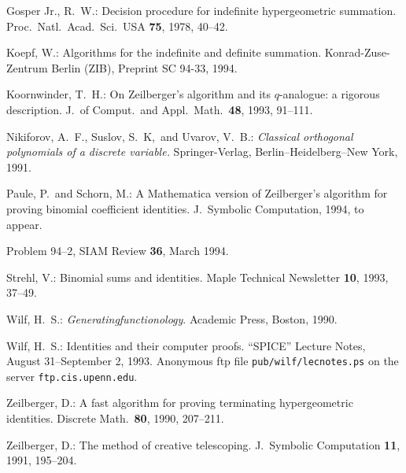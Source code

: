 \begin{thebibliography}{99}

Gosper Jr., R.\ W.:
Decision procedure for indefinite hypergeometric
summation. Proc.\ Natl.\ Acad.\ Sci.\ USA {\bf 75}, 1978, 40--42.

Koepf, W.:
Algorithms for the indefinite and definite summation.
Konrad-Zuse-Zentrum Berlin (ZIB), Preprint SC 94-33, 1994.

Koornwinder, T.\ H.:
On Zeilberger's algorithm and its $q$-analogue: a rigorous description.
J.\ of Comput.\ and Appl.\ Math.\ {\bf 48}, 1993, 91--111.

Nikiforov, A.\ F., Suslov, S.\ K,\ and Uvarov, V.\ B.: {\sl Classical
orthogonal polynomials of a discrete variable.} Springer-Verlag,
Berlin--Heidelberg--New York, 1991.

Paule, P.\ and Schorn, M.: A {\sc Mathematica} version of Zeilberger's
algorithm for proving binomial coefficient identities. J.\ Symbolic
Computation, 1994, to appear.

Problem 94--2, SIAM Review {\bf 36}, March 1994.

Strehl, V.:
Binomial sums and identities. Maple Technical Newsletter {\bf 10}, 1993, 37--49.

Wilf, H.\ S.:
{\sl Generatingfunctionology}. Academic Press, Boston, 1990.

Wilf, H.\ S.:
Identities and their computer proofs. ``SPICE'' Lecture Notes,
August 31--September 2, 1993.
Anonymous ftp file {\tt pub/wilf/lecnotes.ps} on
the server {\tt ftp.cis.upenn.edu}.

Zeilberger, D.:
A fast algorithm for proving terminating hypergeometric identities.
Discrete Math.\ {\bf 80}, 1990, 207--211.

Zeilberger, D.:
The method of creative telescoping.
J.\ Symbolic Computation {\bf 11}, 1991, 195--204.

\end{thebibliography}

